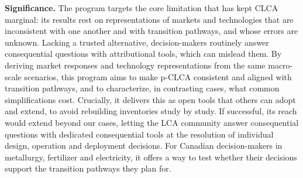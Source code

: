 \documentclass[compact]{nserc} %
\begin{document}
\noindent \textbf{Significance.} The program targets the core limitation that has kept CLCA marginal: its results rest on representations of markets and technologies that are inconsistent with one another and with transition pathways, and whose errors are unknown. Lacking a trusted alternative, decision-makers routinely answer consequential questions with attributional tools, which can mislead them. By deriving market responses and technology representations from the same macro-scale scenarios, this program aims to make p-CLCA consistent and aligned with transition pathways, and to characterize, in contrasting cases, what common simplifications cost. Crucially, it delivers this as open tools that others can adopt and extend, to avoid rebuilding inventories study by study. If successful, its reach would extend beyond our cases, letting the LCA community answer consequential questions with dedicated consequential tools at the resolution of individual design, operation and deployment decisions. For Canadian decision-makers in metallurgy, fertilizer and electricity, it offers a way to test whether their decisions support the transition pathways they plan for.

\pagebreak
\setcounter{page}{1}
\begingroup
\setlength\bibitemsep{0pt}
\printbibliography
\endgroup
\end{document}
